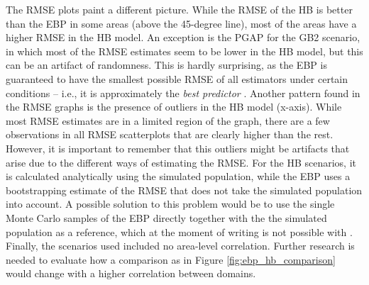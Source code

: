 The RMSE plots paint a different picture.
While the RMSE of the HB is better than the EBP in some areas (above the 45-degree line), most of the areas have a higher RMSE in the HB model.
An exception is the PGAP for the GB2 scenario, in which most of the RMSE estimates seem to be lower in the HB model, but this can be an artifact of randomness.
This is hardly surprising, as the EBP is guaranteed to have the smallest possible RMSE of all estimators under certain conditions – i.e., it is approximately the \textit{best predictor} \citep{molina_small_2014}.
Another pattern found in the RMSE graphs is the presence of outliers in the HB model (x-axis).
While most RMSE estimates are in a limited region of the graph, there are a few observations in all RMSE scatterplots that are clearly higher than the rest.
However, it is important to remember that this outliers might be artifacts that arise due to the different ways of estimating the RMSE.
For the HB scenarios, it is calculated analytically using the simulated population, while the EBP uses a bootstrapping estimate of the RMSE that does not take the simulated population into account.
A possible solution to this problem would be to use the single Monte Carlo samples of the EBP directly together with the the simulated population as a reference, which at the moment of writing is not possible with .
Finally, the scenarios used included no area-level correlation.
Further research is needed to evaluate how a comparison as in Figure \ref{fig:ebp_hb_comparison} would change with a higher correlation between domains.


